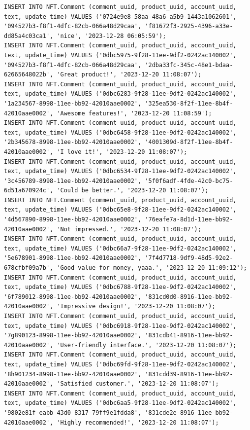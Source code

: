 \documentclass[a4paper, 12pt]{article}
\begin{document}
\begin{lstlisting}
INSERT INTO NFT.Comment (comment_uuid, product_uuid, account_uuid, text, update_time) VALUES ('0724e9e8-58aa-48a6-a5b9-1443a1062601', '094527b3-f8f1-4dfc-82cb-066a48d29caa', 'f81672f3-2925-4396-a33e-dd85a4c03ca1', 'nice', '2023-12-28 06:05:59');
INSERT INTO NFT.Comment (comment_uuid, product_uuid, account_uuid, text, update_time) VALUES ('0dbc5975-9f28-11ee-9df2-0242ac140002', '094527b3-f8f1-4dfc-82cb-066a48d29caa', '2dba33fc-345c-48e1-bdaa-62665648022b', 'Great product!', '2023-12-20 11:08:07');
INSERT INTO NFT.Comment (comment_uuid, product_uuid, account_uuid, text, update_time) VALUES ('0dbc6283-9f28-11ee-9df2-0242ac140002', '1a234567-8998-11ee-bb92-42010aae0002', '325ea530-8f2f-11ee-8b4f-42010aae0002', 'Awesome features!', '2023-12-20 11:08:59');
INSERT INTO NFT.Comment (comment_uuid, product_uuid, account_uuid, text, update_time) VALUES ('0dbc6458-9f28-11ee-9df2-0242ac140002', '2b345678-8998-11ee-bb92-42010aae0002', '4001309d-8f2f-11ee-8b4f-42010aae0002', 'I love it!', '2023-12-20 11:08:07');
INSERT INTO NFT.Comment (comment_uuid, product_uuid, account_uuid, text, update_time) VALUES ('0dbc6534-9f28-11ee-9df2-0242ac140002', '3c456789-8998-11ee-bb92-42010aae0002', '5f0f6adf-4fde-42c0-bc75-6d51a670924c', 'Could be better.', '2023-12-20 11:08:07');
INSERT INTO NFT.Comment (comment_uuid, product_uuid, account_uuid, text, update_time) VALUES ('0dbc65e8-9f28-11ee-9df2-0242ac140002', '4d567890-8998-11ee-bb92-42010aae0002', '76eafe7a-8d1d-11ee-bb92-42010aae0002', 'Not impressed.', '2023-12-20 11:08:07');
INSERT INTO NFT.Comment (comment_uuid, product_uuid, account_uuid, text, update_time) VALUES ('0dbc66a7-9f28-11ee-9df2-0242ac140002', '5e678901-8998-11ee-bb92-42010aae0002', '7f4d7718-9df9-48d5-92e2-678cfbf09a7b', 'Good value for money, yaaa.', '2023-12-20 11:09:12');
INSERT INTO NFT.Comment (comment_uuid, product_uuid, account_uuid, text, update_time) VALUES ('0dbc6788-9f28-11ee-9df2-0242ac140002', '6f789012-8998-11ee-bb92-42010aae0002', '831cd0d0-8916-11ee-bb92-42010aae0002', 'Impressive design!', '2023-12-20 11:08:07');
INSERT INTO NFT.Comment (comment_uuid, product_uuid, account_uuid, text, update_time) VALUES ('0dbc6918-9f28-11ee-9df2-0242ac140002', '7g890123-8998-11ee-bb92-42010aae0002', '831cdb41-8916-11ee-bb92-42010aae0002', 'User-friendly interface.', '2023-12-20 11:08:07');
INSERT INTO NFT.Comment (comment_uuid, product_uuid, account_uuid, text, update_time) VALUES ('0dbc69fd-9f28-11ee-9df2-0242ac140002', '8h901234-8998-11ee-bb92-42010aae0002', '831cdd39-8916-11ee-bb92-42010aae0002', 'Satisfied customer.', '2023-12-20 11:08:07');
INSERT INTO NFT.Comment (comment_uuid, product_uuid, account_uuid, text, update_time) VALUES ('0dbc6aa5-9f28-11ee-9df2-0242ac140002', '9802e81f-eabb-43d0-8317-79ff9e1fdda8', '831cde2e-8916-11ee-bb92-42010aae0002', 'Highly recommended!', '2023-12-20 11:08:07');

\end{lstlisting}
\end{document}
